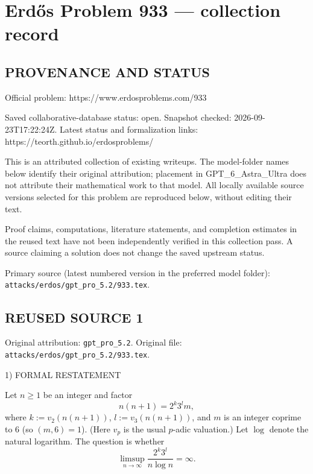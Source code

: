 \section*{Erd\H{o}s Problem 933 --- collection record}

\subsection*{PROVENANCE AND STATUS}
Official problem: https://www.erdosproblems.com/933

Saved collaborative-database status: open.
Snapshot checked: 2026-09-23T17:22:24Z.
Latest status and formalization links: https://teorth.github.io/erdosproblems/

This is an attributed collection of existing writeups. The model-folder names below identify their original attribution; placement in GPT\_6\_Astra\_Ultra does not attribute their mathematical work to that model. All locally available source versions selected for this problem are reproduced below, without editing their text.

Proof claims, computations, literature statements, and completion estimates in the reused text have not been independently verified in this collection pass. A source claiming a solution does not change the saved upstream status.

Primary source (latest numbered version in the preferred model folder): \texttt{attacks/erdos/gpt\_pro\_5.2/933.tex}.

\subsection*{REUSED SOURCE 1}
Original attribution: \texttt{gpt\_pro\_5.2}.
Original file: \texttt{attacks/erdos/gpt\_pro\_5.2/933.tex}.


1) FORMAL RESTATEMENT

Let $n\ge 1$ be an integer and factor
\[
 n(n+1)=2^k3^l m,
\]
where $k:=v_2(n(n+1))$, $l:=v_3(n(n+1))$, and $m$ is an integer coprime to $6$ (so $(m,6)=1$).
(Here $v_p$ is the usual $p$-adic valuation.)
Let $\log$ denote the natural logarithm.
The question is whether
\[
\limsup_{n\to\infty} \frac{2^k3^l}{n\log n}=\infty.
\]

